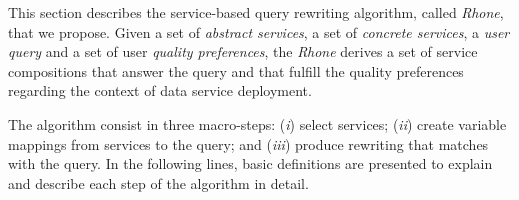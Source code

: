 This section describes the service-based query rewriting algorithm, called \textit{Rhone}, that we propose. 
%
Given a set of \textit{abstract services}, a set of \textit{concrete services}, a
\textit{user query} and a set of user \textit{quality preferences}, the \textit{Rhone} derives a set
of service compositions that answer the query and that fulfill the quality preferences regarding the 
context of data service deployment.
%

%
The algorithm consist in three macro-steps: 
(\textit{i}) select services; 
(\textit{ii}) create variable mappings from services to the query; and 
(\textit{iii}) produce rewriting that matches with the query. 
In the following lines, basic definitions are presented to explain and describe each step of the 
algorithm in detail. 